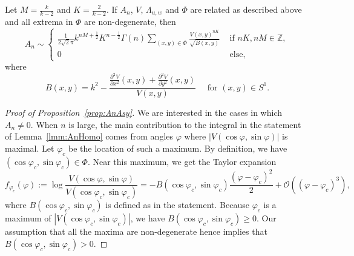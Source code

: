 \documentclass[10pt,a4paper]{amsart}
\newcommand{\Z}{\mathbb{Z}}
\newcommand{\bigO}{\mathcal{O}}
\newcommand{\ol}{\Lambda}
\begin{document}
\begin{proposition}
\label{prop:AnAsy}
Let $M = \frac{k}{k-2}$ and $K=\frac{2}{k-2}$.
If $A_n$, $V$, $\ol_{u,w}$ and $\Phi$ are related as described above and all extrema in $\Phi$ are non-degenerate, then
$$
A_n \sim 
\begin{cases}
\frac{1}{2\sqrt{2}\pi}k^{nM+\frac{1}{2}}K^{n-\frac{1}{2}}\Gamma(n) 
\sum\limits_{(x,y) \in \Phi} \frac{V(x,y)^{nK}}{\sqrt{B(x,y)}}
&\text{ if } nK, nM \in \Z,
\\
0 &\text{ else,}
\end{cases}
$$
where
$$
B(x,y) = 
k^2 - 
\frac{ \frac{\partial^2 V}{\partial x^2}(x,y) + \frac{\partial^2 V}{\partial y^2}(x,y)}{ V(x,y) } \quad \text{ for } (x,y)\in S^1.
$$
\end{proposition}

\begin{proof}[Proof of Proposition~\ref{prop:AnAsy}]
We are interested in the cases in which $A_n\neq 0$.
When $n$ is large, the main contribution to the integral 
in the statement of Lemma~\ref{lmm:AnHomo} comes 
from angles $\varphi$ where $|V(\cos \varphi,\sin \varphi)|$ is 
maximal. Let $\varphi_c$ be the location of such a maximum.
By definition, we have $(\cos \varphi_c,\sin \varphi_c) \in \Phi$.
Near this maximum, we get the Taylor expansion
$$
f_{\varphi_c}(\varphi):=
\log \frac{V(\cos \varphi, \sin \varphi)}{V(\cos \varphi_c, \sin \varphi_c)}
=
-
B(\cos \varphi_c, \sin \varphi_c)
\frac{(\varphi -\varphi_c)^2}{2}
+\bigO((\varphi -\varphi_c)^3),
$$
where $B(\cos \varphi_c, \sin \varphi_c)$ is defined as in the statement.
Because $\varphi_c$ is a maximum of $|V(\cos \varphi_c, \sin \varphi_c)|$, 
we have $B(\cos \varphi_c, \sin \varphi_c) \geq 0$. Our assumption that all the maxima are non-degenerate hence implies that $B(\cos \varphi_c, \sin \varphi_c) > 0$.\par 


\end{proof}
\end{document}
